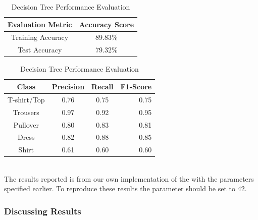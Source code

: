 \begin{table}[!ht]
\begin{subtable}[c]{0.4\textwidth}
\footnotesize
\centering
\begin{tabular}{ c | c }
 \toprule
 Evaluation Metric & Accuracy Score  \\
 \midrule
 Training Accuracy &  89.83\% \\
 Test Accuracy &79.32\% \\
 \bottomrule
\end{tabular}
\captionsetup{justification=centering,margin=1cm}
\end{subtable}
\begin{subtable}[c]{0.6\textwidth}
\footnotesize
\centering
\begin{tabular}{c | c c r}
Class & Precision & Recall & F1-Score\\
\midrule
T-shirt/Top   &    0.76  &    0.75  &    0.75 \\
Trousers   &    0.97  &    0.92  &    0.95 \\
Pullover   &    0.80  &    0.83  &    0.81\\
Dress   &    0.82  &    0.88  &    0.85\\
Shirt   &    0.61  &    0.60  &    0.60\\
\end{tabular}
\captionsetup{justification=centering,margin=1cm}
\end{subtable}
\caption{Decision Tree Performance Evaluation}
\label{dt_evaluation}
\end{table}\\

The results reported is from our own implementation of the  with the parameters specified earlier.
To reproduce these results the  parameter should be set to 42.

\subsubsection{Discussing Results}







